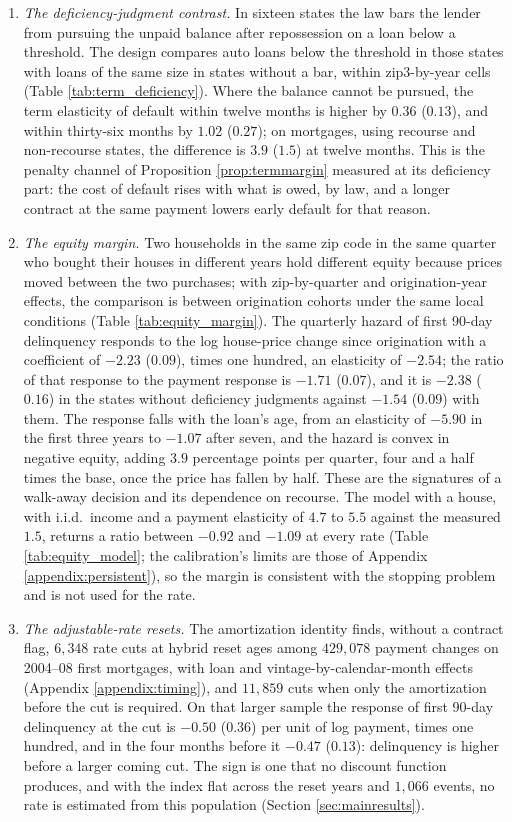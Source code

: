 \begin{enumerate}
\item \emph{The deficiency-judgment contrast.} In sixteen states the law bars the lender from pursuing the unpaid balance after repossession on a loan below a threshold. The design compares auto loans below the threshold in those states with loans of the same size in states without a bar, within zip3-by-year cells (Table \ref{tab:term_deficiency}). Where the balance cannot be pursued, the term elasticity of default within twelve months is higher by $0.36$ ($0.13$), and within thirty-six months by $1.02$ ($0.27$); on mortgages, using recourse and non-recourse states, the difference is $3.9$ ($1.5$) at twelve months. This is the penalty channel of Proposition \ref{prop:termmargin} measured at its deficiency part: the cost of default rises with what is owed, by law, and a longer contract at the same payment lowers early default for that reason.

\item \emph{The equity margin.} Two households in the same zip code in the same quarter who bought their houses in different years hold different equity because prices moved between the two purchases; with zip-by-quarter and origination-year effects, the comparison is between origination cohorts under the same local conditions (Table \ref{tab:equity_margin}). The quarterly hazard of first 90-day delinquency responds to the log house-price change since origination with a coefficient of $-2.23$ ($0.09$), times one hundred, an elasticity of $-2.54$; the ratio of that response to the payment response is $-1.71$ ($0.07$), and it is $-2.38$ ($0.16$) in the states without deficiency judgments against $-1.54$ ($0.09$) with them. The response falls with the loan's age, from an elasticity of $-5.90$ in the first three years to $-1.07$ after seven, and the hazard is convex in negative equity, adding $3.9$ percentage points per quarter, four and a half times the base, once the price has fallen by half. These are the signatures of a walk-away decision and its dependence on recourse. The model with a house, with i.i.d.\ income and a payment elasticity of $4.7$ to $5.5$ against the measured $1.5$, returns a ratio between $-0.92$ and $-1.09$ at every rate (Table \ref{tab:equity_model}; the calibration's limits are those of Appendix \ref{appendix:persistent}), so the margin is consistent with the stopping problem and is not used for the rate.

\item \emph{The adjustable-rate resets.} The amortization identity finds, without a contract flag, $6{,}348$ rate cuts at hybrid reset ages among $429{,}078$ payment changes on 2004--08 first mortgages, with loan and vintage-by-calendar-month effects (Appendix \ref{appendix:timing}), and $11{,}859$ cuts when only the amortization before the cut is required. On that larger sample the response of first 90-day delinquency at the cut is $-0.50$ ($0.36$) per unit of log payment, times one hundred, and in the four months before it $-0.47$ ($0.13$): delinquency is higher before a larger coming cut. The sign is one that no discount function produces, and with the index flat across the reset years and $1{,}066$ events, no rate is estimated from this population (Section \ref{sec:mainresults}).


\end{enumerate}
